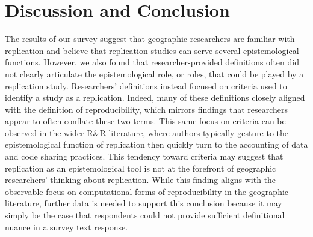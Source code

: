 \documentclass[]{interact}
\theoremstyle{plain}%
\theoremstyle{definition}
\theoremstyle{remark}
\begin{document}
\section*{Discussion and Conclusion}
The results of our survey suggest that geographic researchers are familiar with replication and believe that replication studies can serve several epistemological functions.
However, we also found that researcher-provided definitions often did not clearly articulate the epistemological role, or roles, that could be played by a replication study. 
Researchers' definitions instead focused on criteria used to identify a study as a replication. 
Indeed, many of these definitions closely aligned with the definition of reproducibility, which mirrors  \cite{kedron2023survey} findings that researchers appear to often conflate these two terms. 
This same focus on criteria can be observed in the wider R\&R literature, where authors typically gesture to the epistemological function of replication then quickly turn to the accounting of data and code sharing practices. 
This tendency toward criteria may suggest that replication as an epistemological tool is not at the forefront of geographic researchers' thinking about replication.
While this finding aligns with the observable focus on computational forms of reproducibility in the geographic literature, further data is needed to support this conclusion because it may simply be the case that respondents could not provide sufficient definitional nuance in a survey text response.
\end{document}
